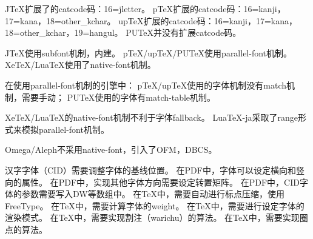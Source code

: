 JTeX扩展了的catcode码：16=jletter。
pTeX扩展的catcode码：16=kanji，17=kana，18=other_kchar。
upTeX扩展的catcode码：16=kanji，17=kana，18=other_kchar，19=hangul。
PUTeX并没有扩展catcode码。

JTeX使用subfont机制，内建。
pTeX/upTeX/PUTeX使用parallel-font机制。
XeTeX/LuaTeX使用了native-font机制。

在使用parallel-font机制的引擎中：
pTeX/upTeX使用的字体机制没有match机制，需要手动；
PUTeX使用的字体有match-table机制。

XeTeX/LuaTeX的native-font机制不利于字体fallback。
LuaTeX-ja采取了range形式来模拟parallel-font机制。

Omega/Aleph不采用native-font，引入了OFM，DBCS。

汉字字体（CID）需要调整字体的基线位置。
在PDF中，字体可以设定横向和竖向的属性。
在PDF中，实现其他字体方向需要设定转置矩阵。
在PDF中，CID字体的参数需要写入DW等数组中。
在TeX中，需要自动进行标点压缩，使用FreeType。
在TeX中，需要计算字体的weight。
在TeX中，需要进行设定字体的渲染模式。
在TeX中，需要实现割注（warichu）的算法。
在TeX中，需要实现圈点的算法。
\bye